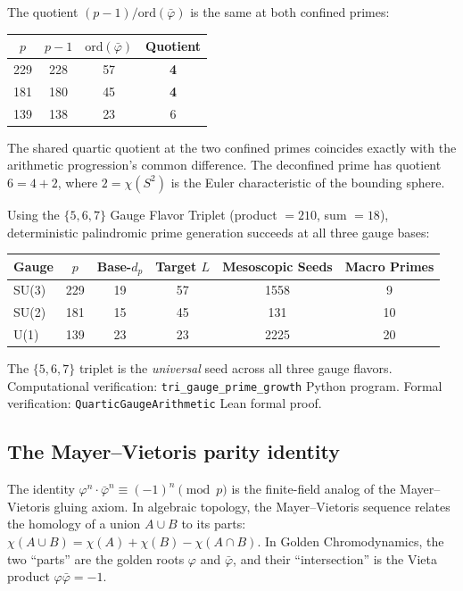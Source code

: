 \begin{result}
The quotient $(p - 1)/\mathrm{ord}(\bar\varphi)$ is the same at both confined primes:
\begin{center}
\begin{tabular}{@{}cccc@{}}
\toprule
$p$ & $p-1$ & $\mathrm{ord}(\bar\varphi)$ & Quotient \\
\midrule
229 & 228 & 57 & \textbf{4} \\
181 & 180 & 45 & \textbf{4} \\
139 & 138 & 23 & 6 \\
\bottomrule
\end{tabular}
\end{center}
The shared quartic quotient at the two confined primes coincides exactly with the arithmetic progression's common difference. The deconfined prime has quotient $6 = 4 + 2$, where $2 = \chi(S^2)$ is the Euler characteristic of the bounding sphere.
\end{result}

\begin{result}
\label{res:tri_gauge_primes}
Using the $\{5, 6, 7\}$ Gauge Flavor Triplet (product $= 210$, sum $= 18$), deterministic palindromic prime generation succeeds at all three gauge bases:
\begin{center}
\begin{tabular}{@{}lccccc@{}}
\toprule
Gauge & $p$ & Base-$d_p$ & Target $L$ & Mesoscopic Seeds & Macro Primes \\
\midrule
SU(3) & 229 & 19 & 57 & 1558 & 9 \\
SU(2) & 181 & 15 & 45 & 131 & 10 \\
U(1) & 139 & 23 & 23 & 2225 & 20 \\
\bottomrule
\end{tabular}
\end{center}
The $\{5, 6, 7\}$ triplet is the \emph{universal} seed across all three gauge flavors. Computational verification: \texttt{tri\_gauge\_prime\_growth} Python program. Formal verification: \texttt{QuarticGaugeArithmetic} Lean formal proof.
\end{result}

\subsection{The Mayer--Vietoris parity identity}
\label{sec:mv_parity}

The identity $\varphi^n \cdot \bar\varphi^n \equiv (-1)^n \pmod{p}$
is the finite-field analog of the Mayer--Vietoris gluing axiom.
In algebraic topology, the Mayer--Vietoris sequence relates the
homology of a union $A \cup B$ to its parts:
$\chi(A \cup B) = \chi(A) + \chi(B) - \chi(A \cap B)$.
In Golden Chromodynamics, the two ``parts'' are the golden roots
$\varphi$ and $\bar\varphi$, and their ``intersection'' is the
Vieta product $\varphi \bar\varphi = -1$.

